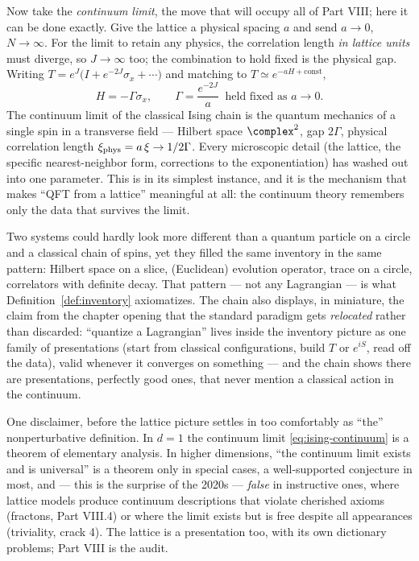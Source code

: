 \begin{eexample}
Now take the \emph{continuum limit}, the move that will occupy all of Part VIII;
here it can be done exactly. Give the lattice a physical spacing $a$ and send $a
\to 0$, $N \to \infty$. For the limit to retain any physics, the correlation
length \emph{in lattice units} must diverge, so $J \to \infty$ too; the
combination to hold fixed is the physical gap. Writing $T = e^J\big(I +
e^{-2J}\sigma_x + \cdots\big)$ and matching to $T \simeq e^{-aH +
\text{const}}$,
\begin{equation}
H = -\Gamma \sigma_x , \qquad \Gamma = \frac{e^{-2J}}{a} \;\; \text{held fixed
as } a \to 0 .
\label{eq:ising-continuum}
\end{equation}
The continuum limit of the classical Ising chain is the quantum mechanics of a
single spin in a transverse field --- Hilbert space $\complex^2$, gap $2\Gamma$,
physical correlation length $\xi_{\rm phys} = a\,\xi \to 1/2\Gamma$. Every
microscopic detail (the lattice, the specific nearest-neighbor form, corrections
to the exponentiation) has washed out into one parameter. This is
 in its simplest instance, and it is the mechanism that makes
``QFT from a lattice'' meaningful at all: the continuum theory remembers only
the data that survives the limit.
\end{eexample}

Two systems could hardly look more different than a quantum particle on a circle
and a classical chain of spins, yet they filled the same inventory in the same
pattern: Hilbert space on a slice, (Euclidean) evolution operator, trace on a
circle, correlators with definite decay. That pattern --- not any Lagrangian ---
is what Definition~\ref{def:inventory} axiomatizes. The chain also displays, in
miniature, the claim from the chapter opening that the standard paradigm gets
\emph{relocated} rather than discarded: ``quantize a Lagrangian'' lives inside
the inventory picture as one family of presentations (start from classical
configurations, build $T$ or $e^{iS}$, read off the data), valid whenever it
converges on something --- and the chain shows there are presentations,
perfectly good ones, that never mention a classical action in the continuum.

One disclaimer, before the lattice picture settles in too comfortably as ``the''
nonperturbative definition. In $d = 1$ the continuum limit
\eqref{eq:ising-continuum} is a theorem of elementary analysis. In higher
dimensions, ``the continuum limit exists and is universal'' is a theorem only in
special cases, a well-supported conjecture in most, and --- this is the surprise
of the 2020s --- \emph{false} in instructive ones, where lattice models produce
continuum descriptions that violate cherished axioms (fractons, Part VIII.4) or
where the limit exists but is free despite all appearances (triviality, crack
4). The lattice is a presentation too, with its own dictionary problems; Part
VIII is the audit.

